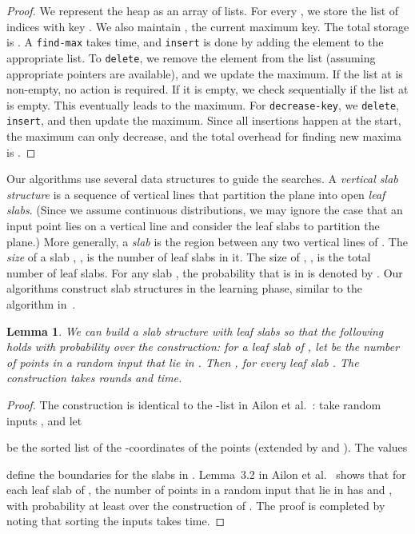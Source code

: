 \documentclass[letterpaper,11pt]{article}
\newtheorem{lemma}[theorem]{Lemma}
\newcommand{\etal}{et al.}
\newcommand{\findmax}{\texttt{find-max}}
\newcommand{\ins}{\texttt{insert}}
\newcommand{\delete}{\texttt{delete}}
\newcommand{\deckey}{\texttt{decrease-key}}
\begin{document}
\begin{proof} 
  We represent the heap as an array 
  of lists. For every ,
  we store the list of indices with key 
  . We also maintain , the current maximum 
  key. The total storage is . A \findmax{}  
  takes  time, and \ins{} is 
  done by adding the element to the appropriate 
  list.  To \delete{}, we remove the element from 
  the list (assuming appropriate pointers are available), 
  and we update the maximum. If the list 
  at  is non-empty, no action is required. If it is empty,
  we check sequentially if the list at  
  is empty.  This eventually leads to the maximum. 
  For \deckey{}, we \delete{}, \ins{}, and then 
  update the maximum.
  Since all insertions happen at the start, the maximum 
  can only decrease, and the total overhead for finding new 
  maxima is .
\end{proof}



Our algorithms use several data structures
to guide the searches. A \emph{vertical slab structure}  is a 
sequence of vertical lines that
partition the plane into open \emph{leaf slabs}. 
(Since we assume continuous distributions, we 
may ignore the case that an input point lies on
a vertical line and consider the leaf slabs to 
partition the plane.)
More generally, a \emph{slab} is the 
region between any two vertical lines of .  
The \emph{size} of a slab , , 
is the number of leaf slabs in it. 
The size of , , is the total number 
of leaf slabs.  For any slab , 
the probability that  
is in  is denoted by .
Our algorithms construct slab 
structures in the learning phase, 
similar to the algorithm 
in~\cite{AilonCCLMS11}.

\begin{lemma}\label{lem:slabstruct}
  We can build a slab structure \textup{} 
  with  leaf slabs so that the following holds
  with probability  over the construction:
  for a leaf slab  of \textup{}, 
  let   be the number of points in a 
  random input  that lie in .  Then 
  , for every leaf slab
  .  The construction 
  takes  rounds and  time.
\end{lemma}

\begin{proof} The construction is identical to
the -list in Ailon \etal~\cite[Lemma~3.2]{AilonCCLMS11}: 
take  random inputs
, 
and let

be the sorted list of the -coordinates
of the points 
(extended by  and ).
The  values 
 
define the boundaries for the slabs in . 
Lemma~3.2 in Ailon \etal~\cite{AilonCCLMS11}
shows that  for each leaf slab 
of , the number  of points
in a random input  that lie in 
has  and 
, with 
probability at least  over
the construction of .
The proof is completed by noting that sorting the
 inputs  takes 
 time.
\end{proof}
\end{document}
